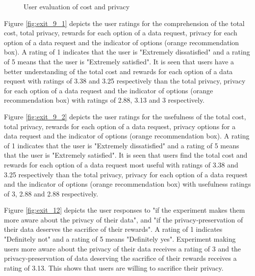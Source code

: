 \begin{figure}[htp]
\centering
{}
\caption{User evaluation of cost and privacy}
\label{fig:st3}
\end{figure}

Figure \ref{fig:exit_9_1} depicts the user ratings for the comprehension of the total cost, total privacy, rewards for each option of a data request, privacy for each option of a data request and the indicator of options (orange recommendation box). A rating of 1 indicates that the user is "Extremely dissatisfied" and a rating of 5 means that the user is "Extremely satisfied". It is seen that users have a better understanding of the total cost and rewards for each option of a data request with ratings of 3.38 and 3.25 respectively than the total privacy, privacy for each option of a data request and the indicator of options (orange recommendation box) with ratings of 2.88, 3.13 and 3 respectively.

Figure \ref{fig:exit_9_2} depicts the user ratings for the usefulness of the total cost, total privacy, rewards for each option of a data request, privacy options for a data request and the indicator of options (orange recommendation box). A rating of 1 indicates that the user is "Extremely dissatisfied" and a rating of 5 means that the user is "Extremely satisfied". It is seen that users find the total cost and rewards for each option of a data request most useful with ratings of 3.38 and 3.25 respectively than the total privacy, privacy for each option of a data request and the indicator of options (orange recommendation box) with usefulness ratings of 3, 2.88 and 2.88 respectively.

Figure \ref{fig:exit_12} depicts the user responses to "if the experiment makes them more aware about the privacy of their data", and "if the privacy-preservation of their data deserves the sacrifice of their rewards". A rating of 1 indicates "Definitely not" and a rating of 5 means "Definitely yes". Experiment making users more aware about the privacy of their data receives a rating of 3 and the privacy-preservation of data deserving the sacrifice of their rewards receives a rating of 3.13. This shows that users are willing to sacrifice their privacy.

